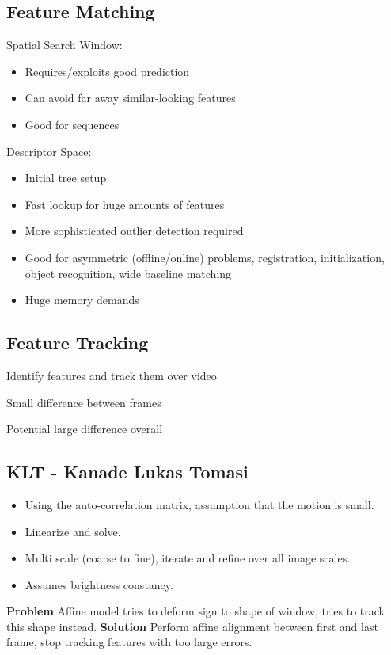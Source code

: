 \begin{enumerate}
\subsection{Feature Matching}

Spatial Search Window:
\begin{itemize}
\item Requires/exploits good prediction
\item Can avoid far away similar-looking features
\item Good for sequences
\end{itemize}

Descriptor Space:
\begin{itemize}
\item Initial tree setup
\item Fast lookup for huge amounts of features
\item More sophisticated outlier detection required
\item Good for asymmetric (offline/online) problems, registration, initialization, object recognition, wide baseline matching
\item Huge memory demands
\end{itemize}



\subsection{Feature Tracking}

Identify features and track them over video

Small difference between frames

Potential large difference overall

\subsection{KLT - Kanade Lukas Tomasi}
\begin{itemize}
\item Using the auto-correlation matrix, assumption that the motion is small.
\item Linearize and solve.
\item Multi scale (coarse to fine), iterate and refine over all image scales.
\item Assumes brightness constancy.
\end{itemize}

\textbf{Problem}  Affine model tries to deform sign to shape of window, tries to track this shape instead. 
\textbf{Solution} Perform affine alignment between first and last frame, stop tracking features with too large errors. 


\end{enumerate}

